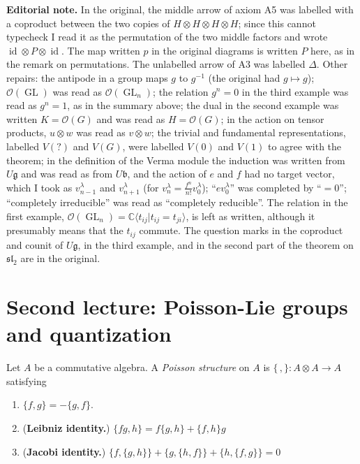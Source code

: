 \medskip\noindent
{\bf Editorial note.}
In the original, the middle arrow of
axiom A5 was labelled with a coproduct
between the two copies of
$H\otimes H\otimes H\otimes H$; since
this cannot typecheck I read it as the
permutation of the two middle factors
and wrote $\operatorname{id}\otimes P
\otimes\operatorname{id}$. The map written
$p$ in the original diagrams is written
$P$ here, as in the remark on
permutations. The unlabelled arrow of A3
was labelled $\Delta$. Other repairs:
the antipode in a group maps $g$ to
$g^{-1}$ (the original had $g\mapsto g$);
$\mathcal{O}(\operatorname{GL})$ was read
as $\mathcal{O}(\operatorname{GL}_{n})$;
the relation $g^{n}=0$ in the third
example was read as $g^{n}=1$, as in
the summary above; the dual in the second
example was written $K=\mathcal{O}(G)$ and
was read as $H=\mathcal{O}(G)$; in the
action on tensor products, $u\otimes w$
was read as $v\otimes w$; the
trivial and fundamental
representations, labelled $V(?)$ and
$V(G)$, were labelled $V(0)$ and $V(1)$ to
agree with the theorem; in the
definition of the Verma module the
induction was written from
$U\mathfrak{g}$ and was read as from
$U\mathfrak{b}$, and the action of $e$ and
$f$ had no target vector, which I took as
$v_{n-1}^{\lambda}$ and
$v_{n+1}^{\lambda}$ (for
$v_{n}^{\lambda}=\frac{f^{n}}{n!}
v_{0}^{\lambda}$); ``$ev_{0}^{\lambda}$''
was completed by ``$=0$'';
``completely irreducible'' was read as
``completely reducible''. The
relation in the first example,
$\mathcal{O}(\operatorname{GL}_{n})=
\mathbb{C}\langle t_{ij}|t_{ij}=t_{ji}
\rangle$, is left as written, although it
presumably means that the $t_{ij}$
commute. The
question marks in the coproduct and counit
of $U\mathfrak{g}$, in the third example,
and in the second part of the theorem on
$\mathfrak{sl}_{2}$ are in the original.

\section{Second lecture: Poisson-Lie
groups and quantization}
\label{section-second-lecture}

\begin{definition}
\label{definition-l2-poisson-structure}
Let $A$ be a commutative algebra. A
{\it Poisson structure} on $A$ is
$\{\,,\} :A\otimes A\to A$ satisfying
\begin{enumerate}
\item $\{f,g\} =-\{g,f\}$.
\item ({\bf Leibniz identity.})
$\{fg,h\} =f\{g,h\}+\{f,h\} g$
\item ({\bf Jacobi identity.})
$\{f,\{g,h\} \} +\{g,\{h,f\} \}
+\{h,\{f,g\} \}=0$
\end{enumerate}
\end{definition}

